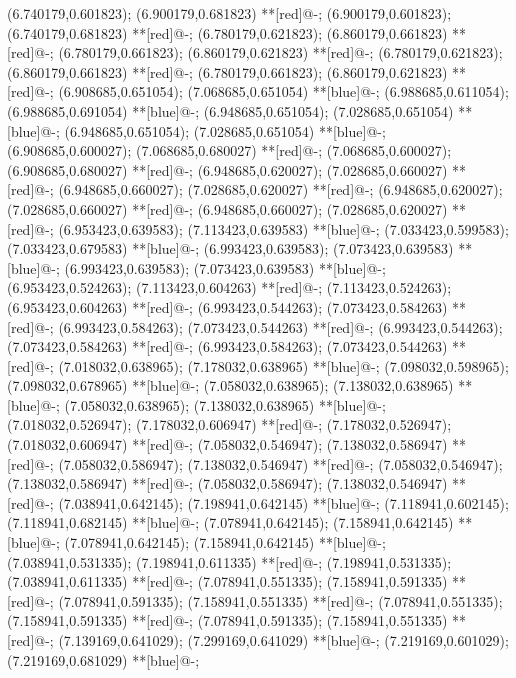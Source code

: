 (6.740179,0.601823); (6.900179,0.681823) **[red]@{-};
(6.900179,0.601823); (6.740179,0.681823) **[red]@{-};
(6.780179,0.621823); (6.860179,0.661823) **[red]@{-};
(6.780179,0.661823); (6.860179,0.621823) **[red]@{-};
(6.780179,0.621823); (6.860179,0.661823) **[red]@{-};
(6.780179,0.661823); (6.860179,0.621823) **[red]@{-};
(6.908685,0.651054); (7.068685,0.651054) **[blue]@{-};
(6.988685,0.611054); (6.988685,0.691054) **[blue]@{-};
(6.948685,0.651054); (7.028685,0.651054) **[blue]@{-};
(6.948685,0.651054); (7.028685,0.651054) **[blue]@{-};
(6.908685,0.600027); (7.068685,0.680027) **[red]@{-};
(7.068685,0.600027); (6.908685,0.680027) **[red]@{-};
(6.948685,0.620027); (7.028685,0.660027) **[red]@{-};
(6.948685,0.660027); (7.028685,0.620027) **[red]@{-};
(6.948685,0.620027); (7.028685,0.660027) **[red]@{-};
(6.948685,0.660027); (7.028685,0.620027) **[red]@{-};
(6.953423,0.639583); (7.113423,0.639583) **[blue]@{-};
(7.033423,0.599583); (7.033423,0.679583) **[blue]@{-};
(6.993423,0.639583); (7.073423,0.639583) **[blue]@{-};
(6.993423,0.639583); (7.073423,0.639583) **[blue]@{-};
(6.953423,0.524263); (7.113423,0.604263) **[red]@{-};
(7.113423,0.524263); (6.953423,0.604263) **[red]@{-};
(6.993423,0.544263); (7.073423,0.584263) **[red]@{-};
(6.993423,0.584263); (7.073423,0.544263) **[red]@{-};
(6.993423,0.544263); (7.073423,0.584263) **[red]@{-};
(6.993423,0.584263); (7.073423,0.544263) **[red]@{-};
(7.018032,0.638965); (7.178032,0.638965) **[blue]@{-};
(7.098032,0.598965); (7.098032,0.678965) **[blue]@{-};
(7.058032,0.638965); (7.138032,0.638965) **[blue]@{-};
(7.058032,0.638965); (7.138032,0.638965) **[blue]@{-};
(7.018032,0.526947); (7.178032,0.606947) **[red]@{-};
(7.178032,0.526947); (7.018032,0.606947) **[red]@{-};
(7.058032,0.546947); (7.138032,0.586947) **[red]@{-};
(7.058032,0.586947); (7.138032,0.546947) **[red]@{-};
(7.058032,0.546947); (7.138032,0.586947) **[red]@{-};
(7.058032,0.586947); (7.138032,0.546947) **[red]@{-};
(7.038941,0.642145); (7.198941,0.642145) **[blue]@{-};
(7.118941,0.602145); (7.118941,0.682145) **[blue]@{-};
(7.078941,0.642145); (7.158941,0.642145) **[blue]@{-};
(7.078941,0.642145); (7.158941,0.642145) **[blue]@{-};
(7.038941,0.531335); (7.198941,0.611335) **[red]@{-};
(7.198941,0.531335); (7.038941,0.611335) **[red]@{-};
(7.078941,0.551335); (7.158941,0.591335) **[red]@{-};
(7.078941,0.591335); (7.158941,0.551335) **[red]@{-};
(7.078941,0.551335); (7.158941,0.591335) **[red]@{-};
(7.078941,0.591335); (7.158941,0.551335) **[red]@{-};
(7.139169,0.641029); (7.299169,0.641029) **[blue]@{-};
(7.219169,0.601029); (7.219169,0.681029) **[blue]@{-};

